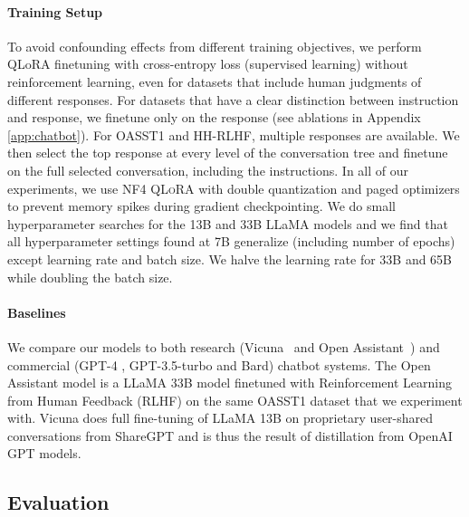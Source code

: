 \documentclass{article}
\newcommand{\method}{\textsc{QLoRA}\xspace}
\newcommand{\pagedoptim}{paged optimizers\xspace}
\begin{document}
\paragraph{Training Setup} 
To avoid confounding effects from different training objectives, we perform QLoRA finetuning with cross-entropy loss (supervised learning) without reinforcement learning, even for datasets that include human judgments of different responses. For datasets that have a clear distinction between instruction and response, we finetune only on the response (see ablations in Appendix \ref{app:chatbot}). For OASST1 and HH-RLHF, multiple responses are available. We then select the top response at every level of the conversation tree and finetune on the full selected conversation, including the instructions. 
In all of our experiments, we use NF4 \method with double quantization and \pagedoptim to prevent memory spikes during gradient checkpointing. We do small hyperparameter searches for the 13B and 33B LLaMA models and we find that all hyperparameter settings found at 7B generalize (including number of epochs) except learning rate and batch size. We halve the learning rate for 33B and 65B while doubling the batch size. 

\paragraph{Baselines} We compare our models to both research (Vicuna~\citep{vicuna2023} and Open Assistant~\citep{kopf2023openassistant}) and commercial (GPT-4 \citep{openai2023gpt}, GPT-3.5-turbo and Bard) chatbot systems. The Open Assistant model is a LLaMA 33B model finetuned with Reinforcement Learning from Human Feedback (RLHF) on the same OASST1 dataset that we experiment with. Vicuna does full fine-tuning of LLaMA 13B on proprietary user-shared conversations from ShareGPT and is thus the result of distillation from OpenAI GPT models.



\subsection{Evaluation}
\end{document}
